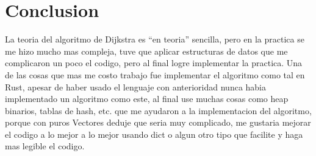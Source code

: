\documentclass{article}
\begin{document}
\section*{Conclusion}
La teoria del algoritmo de Dijkstra es ``en teoria'' sencilla, pero en la practica se me hizo
mucho mas compleja, tuve que aplicar estructuras de datos que me
complicaron un poco el codigo, pero al final logre implementar la practica. Una
de las cosas que mas me costo trabajo fue implementar el algoritmo como tal en Rust,
apesar de haber usado el lenguaje con anterioridad nunca habia implementado un algoritmo como
este, al final use muchas cosas como heap binarios, tablas de hash, etc. que me ayudaron a
la implementacion del algoritmo, porque con puros Vectores deduje que seria muy complicado, me gustaria
mejorar el codigo a lo mejor a lo mejor usando dict o algun otro tipo que facilite y haga mas
legible el codigo.
\end{document}
